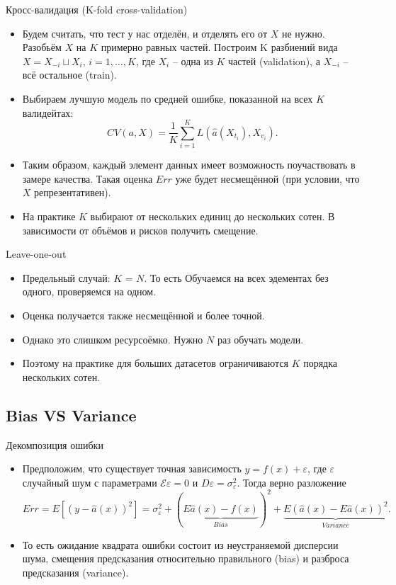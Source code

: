 \documentclass[9pt]{beamer}
\begin{document}
\begin{frame}{Кросс-валидация (K-fold cross-validation)}
\begin{itemize}
    \item Будем считать, что тест у нас отделён, и отделять его от $X$ не нужно. Разобьём $X$ на $K$ примерно равных частей. Построим K разбиений вида $X = X_{-i} \sqcup X_{i}$, $i=1,\ldots, K$, где $X_{i}$ -- одна из $K$ частей (validation), а $X_{-i}$ -- всё остальное (train).
    \item Выбираем лучшую модель по средней ошибке, показанной на всех $K$ валидейтах:
    $$CV(a, X) = \frac{1}{K} \sum_{i=1}^K L(\hat a(X_{t_i}), X_{v_i}).$$
    \item Таким образом, каждый элемент данных имеет возможность поучаствовать в замере качества. Такая оценка $Err$ уже будет несмещённой (при условии, что $X$ репрезентативен).
    \item На практике $K$ выбирают от нескольких единиц до нескольких сотен. В зависимости от объёмов и рисков получить смещение.
\end{itemize}
\end{frame}

\begin{frame}{Leave-one-out}
    \begin{itemize}
        \item Предельный случай: $K$ = $N$. То есть Обучаемся на всех эдементах без одного, проверяемся на одном.
        \item Оценка получается также несмещённой и более точной.
        \item Однако это слишком ресурсоёмко. Нужно $N$ раз обучать модели.
        \item Поэтому на практике для больших датасетов ограничиваются $K$ порядка нескольких сотен.
    \end{itemize}
\end{frame}

\subsection{Bias VS Variance}
\begin{frame}{Декомпозиция ошибки}
    \begin{itemize}
        \item Предположим, что существует точная зависимость $y = f(x) +\varepsilon$, где $\varepsilon$ случайный шум с параметрами $\mathcal{E}\varepsilon = 0$ и $D\varepsilon = \sigma^2_\varepsilon$.
        Тогда верно разложение
        $$Err = E[(y - \hat a(x))^2] = \sigma^2_\varepsilon + (\underbrace{E\hat a(x) - f(x)}_{Bias})^2 + \underbrace{E(\hat a(x) - E\hat a(x))^2}_{Variance}.$$
        \item То есть ожидание квадрата ошибки состоит из неустраняемой дисперсии шума, смещения предсказания относительно правильного (bias) и разброса предсказания (variance).
    \end{itemize}
\end{frame}
\end{document}
